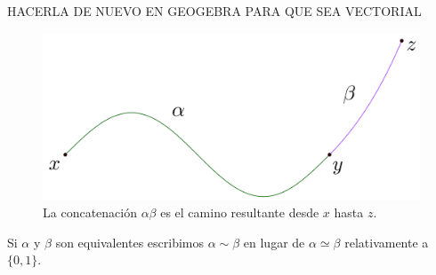 \documentclass[bibtex, anon]{TEMat-article}
\begin{document}
HACERLA DE NUEVO EN GEOGEBRA PARA QUE SEA VECTORIAL
\begin{figure}[h!]
	\centering
	\includegraphics[scale=0.15]{Imagenes/yux}
	\caption{La concatenación $\alpha\beta$ es el camino resultante desde $x$ hasta $z$.}
\end{figure}

\begin{nota} Si $\alpha$ y $\beta$ son equivalentes escribimos $\alpha\sim\beta$ en lugar de $\alpha\simeq\beta$ relativamente a $\{0,1\}$.
\end{nota}
\end{document}
